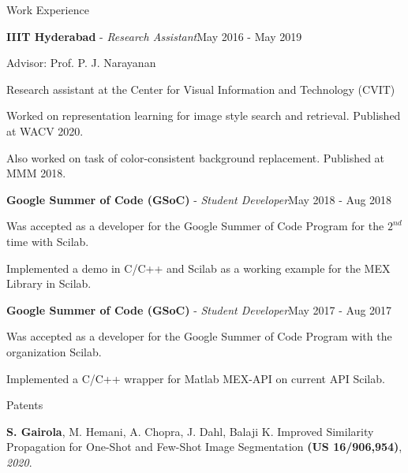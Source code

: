 \documentclass{resume} %
\begin{document}
\begin{rSection}{Work Experience}
\vspace{-3pt}
\begin{rSubsection}{\textbf{IIIT Hyderabad} - \textit{Research Assistant}}{May 2016 - May 2019}{}{}
\begin{small}
\item Advisor: Prof. P. J. Narayanan
\item Research assistant at the Center for Visual Information and Technology (CVIT)
\item Worked on representation learning for image style search and retrieval. Published at WACV 2020.
\item Also worked on task of color-consistent background replacement. Published at MMM 2018.
\end{small}
\end{rSubsection}

\vspace{-3pt}
\begin{rSubsection}{\textbf{Google Summer of Code (GSoC)} - \textit{Student Developer}}{May 2018 - Aug 2018}{}{}
\begin{small}
\item Was accepted as a developer for the Google Summer of Code Program for the $2^{nd}$ time with Scilab.
\item Implemented a demo in C/C++ and Scilab as a working example for the MEX Library in Scilab.
\end{small}
\end{rSubsection}

\vspace{-3pt}
\begin{rSubsection}{\textbf{Google Summer of Code (GSoC)} - \textit{Student Developer}}{May 2017 - Aug 2017}{}{}
\begin{small}
\item Was accepted as a developer for the Google Summer of Code Program with the organization Scilab.
\item Implemented a C/C++ wrapper for Matlab MEX-API on current API Scilab.
\end{small}
\end{rSubsection}
\end{rSection}



\begin{rSection}{Patents}
\begin{rSubsection}{\large \underline{\textbf{}} }{}{}{}
 \item \textbf{S. Gairola}, M. Hemani, A. Chopra, J. Dahl, Balaji K. Improved Similarity Propagation for One-Shot and Few-Shot Image Segmentation \textbf{(US 16/906,954)}, \textit{2020}.
\end{rSubsection}
\end{rSection}
\end{document}
